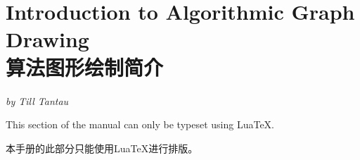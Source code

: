 %
%
%


\section{Introduction to Algorithmic Graph Drawing\\算法图形绘制简介}
\label{section-intro-gd}

\emph{by Till Tantau}

\ifluatex
\else
    This section of the manual can only be typeset using Lua\TeX.

    本手册的此部分只能使用Lua\TeX 进行排版。

    \expandafter\endinput
\fi


\subsection{What Is Algorithmic Graph Drawing?\\什么是算法图形绘制？}

\emph{Algorithmic graph drawing} (or just \emph{graph drawing} in the
following) is the process of computing algorithmically where the nodes of a
graph are positioned on a page so that the graph ``looks nice''. The idea is
that you, as human (or you, as a machine, if you happen to be a machine and
happen to be reading this document) just specify which nodes are present in a
graph and which edges are present. Additionally, you may add some ``hints''
like ``this node should be near the center'' or ``this edge is pretty
important''. You do \emph{not} specify where, exactly, the nodes and edges
should be. This is something you leave to a \emph{graph drawing algorithm}. The
algorithm gets your description of the graph as an input and then decides where
the nodes should go on the page.

\emph{算法图形绘制}（或简称为\emph{图形绘制}）是通过算法计算图形节点在页面上的位置，使得图形“看起来漂亮”。核心思想是，您作为人类（或者如果您碰巧是一台机器并且正在阅读本文档，则您作为机器）只需指定图中存在的节点和边。此外，您可以添加一些“提示”，例如“此节点应靠近中心”或“此边非常重要”。但是，您\emph{不需要}指定节点和边的确切位置，这是由\emph{图形绘制算法}来完成的。该算法将您对图形的描述作为输入，然后决定节点在页面上的位置。


